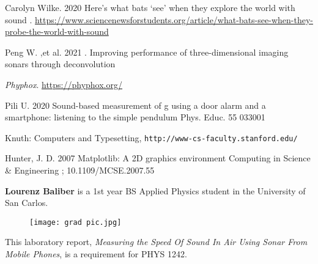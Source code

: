 \documentclass{article}
\begin{document}
\begin{multicols}{2}
\begin{thebibliography}{9}

Carolyn Wilke. 2020 Here’s what bats ‘see’ when they explore the world with sound . \href{https://www.sciencenewsforstudents.org/article/what-bats-see-when-they-probe-the-world-with-sound}{https://www.sciencenewsforstudents.org/article/what-bats-see-when-they-probe-the-world-with-sound}

Peng W. ,et al. 2021 . Improving performance of three-dimensional imaging sonars through deconvolution

\textit{Phyphox}. \href{https://phyphox.org/}{https://phyphox.org/}

Pili U. 2020 Sound-based measurement of g using
a door alarm and a smartphone: listening to the simple
pendulum Phys. Educ. 55 033001

Knuth: Computers and Typesetting,
\texttt{http://www-cs-faculty.stanford.edu/}

Hunter, J. D. 2007 Matplotlib: A 2D graphics environment Computing in Science \& Engineering ; 10.1109/MCSE.2007.55

\end{thebibliography}

\noindent \textbf{Lourenz Baliber} is a 1st year BS Applied Physics student in the University of San Carlos.
\begin{wrapfigure}{l}{4cm}
  \centering
  \texttt{[image: grad pic.jpg]} 
\end{wrapfigure}
This laboratory report, \textit{Measuring the Speed Of Sound In Air Using Sonar From Mobile Phones}, is a requirement for PHYS 1242.

\end{multicols}
\end{document}

